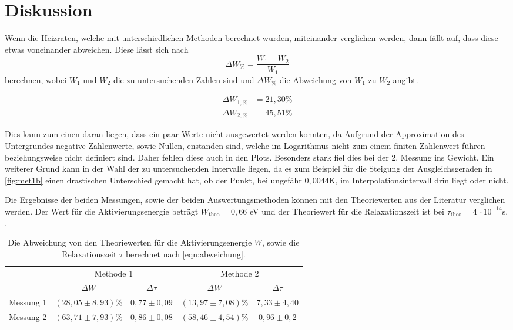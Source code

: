 \section{Diskussion}
\label{sec:Diskussion}

Wenn die Heizraten, welche mit unterschiedlichen Methoden berechnet wurden, miteinander verglichen werden, dann fällt auf, dass diese etwas voneinander abweichen. Diese lässt sich 
nach 
\begin{equation}
    \label{eqn:abweichung}
    \Delta W_{\%} = \frac{W_1-W_2}{W_1}
\end{equation}
\noindent
berechnen, wobei $W_1$ und $W_2$ die zu untersuchenden Zahlen sind und $\Delta W_{\%}$ die Abweichung von $W_1$ zu $W_2$ angibt.

\begin{align*}
    \Delta W_{1,\%} &=  21,30\%   \\
    \Delta W_{2,\%} &=  45,51\%
  \end{align*}

  \noindent
Dies kann zum einen daran liegen, dass ein paar Werte nicht ausgewertet werden konnten, da Aufgrund der Approximation des Untergrundes negative Zahlenwerte, sowie Nullen, enstanden sind, welche
im Logarithmus nicht zum einem finiten Zahlenwert führen beziehungsweise nicht definiert sind. Daher fehlen diese auch in den Plots. Besonders stark fiel dies bei der 2. Messung ins Gewicht.
Ein weiterer Grund kann in der Wahl der zu untersuchenden Intervalle liegen, da es zum Beispiel für die Steigung der Ausgleichsgeraden in \autoref{fig:met1b} einen drastischen Unterschied gemacht hat, ob der Punkt, bei
ungefähr $0,0044$K, im Interpolationsintervall drin liegt oder nicht.

\noindent
Die Ergebnisse der beiden Messungen, sowie der beiden Auswertungsmethoden können mit den Theoriewerten aus der Literatur verglichen werden. 
Der Wert für die Aktivierungsenergie beträgt $W_\text{theo} = 0,66$ eV und der Theoriewert für die Relaxationszeit ist bei $\tau_\text{theo} = 4 \, \cdot 10^{-14}$s. \cite{muccillo}.

\begin{table}[h]
  \centering
  \caption{Die Abweichung von den Theoriewerten für die Aktivierungsenergie $W$, sowie die Relaxationszeit $\tau$ berechnet nach \autoref{eqn:abweichung}.}
  \label{tab:ergebnisse}
  \begin{tabular}{c c c c c}
    \toprule
    &\multicolumn{2}{c}{Methode 1} &\multicolumn{2}{c}{Methode 2}\\
    \cmidrule(lr){2-3}\cmidrule(lr){4-5}
                 &$ \Delta W$  &$\Delta \tau$ & $\Delta W$    & $\Delta \tau$   \\
    \midrule
    Messung 1    & $(28,05 \pm 8,93)\%$              & $0,77 \pm 0,09$& $(13,97 \pm 7,08)\%$                 & $7,33 \pm 4,40$  \\   
    Messung 2    & $(63,71 \pm 7,93)\%$              & $0,86 \pm 0,08$ & $(58,46 \pm 4,54)\%$                 & $0,96\pm 0,2$  \\   
    \bottomrule
  \end{tabular}
\end{table}

